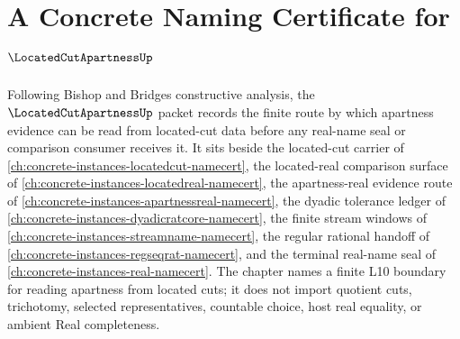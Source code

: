 \chapter{A Concrete Naming Certificate for $\LocatedCutApartnessUp$}
\label{ch:concrete-instances-located-cut-apartness-namecert}

Following Bishop and Bridges constructive analysis, the $\LocatedCutApartnessUp$ packet records the finite route by which apartness evidence can be read from located-cut data before any real-name seal or comparison consumer receives it. It sits beside the located-cut carrier of \autoref{ch:concrete-instances-locatedcut-namecert}, the located-real comparison surface of \autoref{ch:concrete-instances-locatedreal-namecert}, the apartness-real evidence route of \autoref{ch:concrete-instances-apartnessreal-namecert}, the dyadic tolerance ledger of \autoref{ch:concrete-instances-dyadicratcore-namecert}, the finite stream windows of \autoref{ch:concrete-instances-streamname-namecert}, the regular rational handoff of \autoref{ch:concrete-instances-regseqrat-namecert}, and the terminal real-name seal of \autoref{ch:concrete-instances-real-namecert}. The chapter names a finite L10 boundary for reading apartness from located cuts; it does not import quotient cuts, trichotomy, selected representatives, countable choice, host real equality, or ambient Real completeness.

